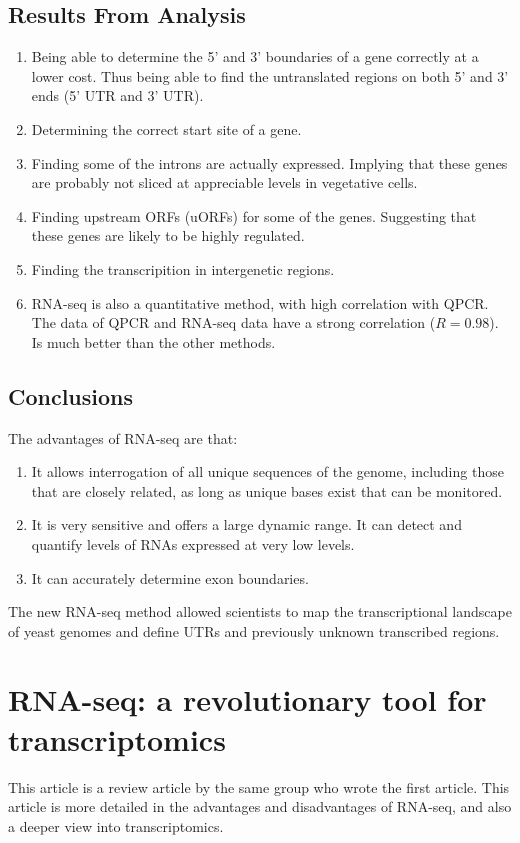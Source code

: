 \documentclass[a4paper,12pt]{article}
\begin{document}
	\subsection{Results From Analysis}
	\begin{enumerate}
		\item Being able to determine the 5' and 3' boundaries of a gene correctly at a lower cost. Thus being able to find the untranslated regions on both 5' and 3' ends (5' UTR and 3' UTR).
		\item Determining the correct start site of a gene.
		\item Finding some of the introns are actually expressed. Implying that these genes are probably not sliced at appreciable levels in vegetative cells.
		\item Finding upstream ORFs (uORFs) for some of the genes. Suggesting that these genes are likely to be highly regulated.
		\item Finding the transcripition in intergenetic regions.
		\item RNA-seq is also a quantitative method, with high correlation with QPCR. The data of QPCR and RNA-seq data have a strong correlation ($R=0.98$). Is much better than the other methods.
	\end{enumerate}
	
	\subsection{Conclusions}
	The advantages of RNA-seq are that:
	\begin{enumerate}
		\item It allows interrogation of all unique sequences of the genome, including those that are closely related, as long as unique bases exist that can be monitored.
		\item It is very sensitive and offers a large dynamic range. It can detect and quantify levels of RNAs expressed at very low levels.
		\item It can accurately determine exon boundaries.
	\end{enumerate}
	
	The new RNA-seq method allowed scientists to map the transcriptional landscape of yeast genomes and define UTRs and previously unknown transcribed regions.
\section{\large{{RNA-seq}: a revolutionary tool for transcriptomics}}
This article is a review article by the same group who wrote the first article. This article is more detailed in the advantages and disadvantages of RNA-seq, and also a deeper view into transcriptomics.
\end{document}
